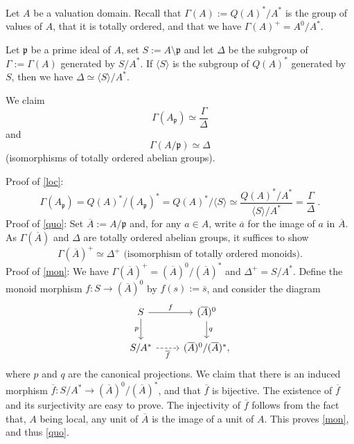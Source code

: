\documentclass[parskip=half,fontsize=12pt]{scrartcl}%
\newcommand{\mf}{\mathfrak}
\newcommand{\ppp}{\mf p}
\begin{document}
Let $A$ be a valuation domain. Recall that $\Gamma(A):=Q(A)^*/A^*$ is the group of values of $A$, that it is totally ordered, and that we have $\Gamma(A)^+=A^0/A^*$. 

Let $\ppp$ be a prime ideal of $A$, set $S:=A\setminus\ppp$ and let $\Delta$ be the subgroup of $\Gamma:=\Gamma(A)$ generated by $S/A^*$. If $\langle S\rangle$ is the subgroup of $Q(A)^*$ generated by $S$, then we have $\Delta\simeq\langle S\rangle/A^*$.

We claim 
\begin{equation}\label{loc}
\Gamma(A_\ppp)\simeq\frac{\Gamma}{\Delta}
\end{equation}
and 
\begin{equation}\label{quo}
\Gamma(A/\ppp)\simeq\Delta%
\end{equation}
(isomorphisms of totally ordered abelian groups).

Proof of \eqref{loc}:
$$
\Gamma(A_\ppp)=Q(A)^*/(A_\ppp)^*=Q(A)^*/\langle S\rangle\simeq\frac{Q(A)^*/A^*}{\langle S\rangle/A^*}=\frac{\Gamma}{\Delta}\ .
$$ 
Proof of \eqref{quo}: Set $\overline A:=A/\ppp$ and, for any $a\in A$, write $\overline a$ for the image of $a$ in $\overline A$. %
As $\Gamma(\overline A)$ and $\Delta$ are totally ordered abelian groups, it suffices to show 
\begin{equation}\label{mon}
\Gamma(\overline A)^+\simeq\Delta^+\text{ (isomorphism of totally ordered monoids).}
\end{equation}
Proof of \eqref{mon}: We have $\Gamma(\overline A)^+=(\overline A)^0/(\overline A)^*$ and $\Delta^+=S/A^*$. Define the monoid morphism $f:S\to(\overline A)^0$ by $f(s):=\overline s$, and consider the diagram 
$$
\begin{tikzcd}
S\ar[r,"f"]\ar[d,"p"']&(\overline A)^0\ar[d,"q"]\\ 
S/A^*\ar[r,dashrightarrow,"\overline f"']&(\overline A)^0/(\overline A)^*,
\end{tikzcd}
$$ 
where $p$ and $q$ are the canonical projections. We claim that there is an induced morphism $\overline f:S/A^*\to(\overline A)^0/(\overline A)^*$, and that $\overline f$ is bijective. The existence of $\overline f$ and its surjectivity are easy to prove. The injectivity of $\overline f$ follows from the fact that, $A$ being local, any unit of $\overline A$ is the image of a unit of $A$. This proves \eqref{mon}, and thus \eqref{quo}.
\end{document}
